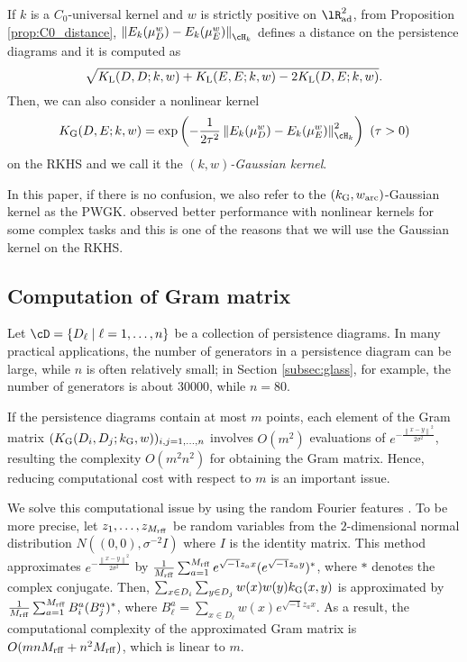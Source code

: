\documentclass{article}
\providecommand{\norm}[1]{\left\lVert#1\right\rVert}
\providecommand{\pare}[1]{\left( #1 \right)}
\providecommand{\dk}[4]{\norm{E_{#1}(\mu^{#2}_{#3}) - E_{#1}(\mu^{#2}_{#4})}_{\cH_{#1}}}
\begin{document}
If $k$ is a $C_{0}$-universal kernel and $w$ is strictly positive on $\lR^{2}_{{\rm ad}}$, from Proposition \ref{prop:C0_distance}, $\dk{k}{w}{D}{E}$ defines a distance on the persistence diagrams and it is computed as 
\[
\sqrt{K_{{\rm L}}(D,D;k,w)+K_{{\rm L}}(E,E;k,w)-2K_{{\rm L}}(D,E;k,w)}. 
\]
Then, we can also consider a nonlinear kernel
\begin{align}
K_{{\rm G}}(D, E; k,w) = \exp \pare{- \frac{1 }{ 2 \tau^{2} } \dk{k}{w}{D}{E}^{2} } \ (\tau >0)  \label{eq:gauss_rkhs}
\end{align}
on the RKHS and we call it the {\em $(k,w)$-Gaussian kernel}.

In this paper, if there is no confusion, we also refer to the $(k_{{\rm G}},w_{{\rm arc}})$-Gaussian kernel as the PWGK.
\cite{MFDS12} observed better performance with nonlinear kernels for some complex tasks and this is one of the reasons that we will use the Gaussian kernel on the RKHS.


\subsection{Computation of Gram matrix}
\label{subsec:calculation}

Let $\cD=\{D_{\ell} \mid \ell=1,\ldots,n\}$ be a collection of persistence diagrams.
In many practical applications, the number of generators in a persistence diagram can be large, while $n$ is often relatively small;
in Section \ref{subsec:glass}, for example, the number of generators is about 30000, while $n=80$.

If the persistence diagrams contain at most $m$ points, each element of the Gram matrix $(K_{{\rm G}}(D_{i},D_{j};k_{{\rm G}},w))_{i,j=1,\ldots,n}$ involves $O(m^2)$ evaluations of $e^{-\frac{\norm{x-y}^{2}}{2\sigma^{2}}}$, resulting the complexity $O(m^{2}n^{2})$ for obtaining the Gram matrix.
Hence, reducing computational cost with respect to $m$ is an important issue.

We solve this computational issue by using the random Fourier features \cite{RR07}.
To be more precise, let $z_{1},\ldots,z_{M_{{\rm rff}}}$ be random variables from the $2$-dimensional normal distribution $N( (0,0), \sigma^{-2} I)$ where $I$ is the identity matrix.  This method approximates $e^{-\frac{\norm{x-y}^{2}}{2\sigma^{2}}}$ by $\frac{1}{M_{{\rm rff}}}\sum_{a=1}^{M_{{\rm rff}}} e^{\sqrt{-1}z_{a}x} (e^{\sqrt{-1}z_{a}y})^{*}$, where $*$ denotes the complex conjugate.
Then,  $\sum_{x \in D_{i}} \sum_{y \in D_{j}} w(x)w(y)k_{{\rm G}}(x,y)$ is approximated by $\frac{1}{M_{{\rm rff}}}\sum_{a=1}^{M_{{\rm rff}}}B^{a}_{i} (B^{a}_{j})^{*}$, where $B^{a}_{\ell}=\sum_{x \in D_{\ell}} w(x) e^{\sqrt{-1}z_{a}x}$.
As a result, the computational complexity of the approximated Gram matrix is $O(mnM_{{\rm rff}}+n^2M_{{\rm rff}})$, which is linear to $m$.
\end{document}
